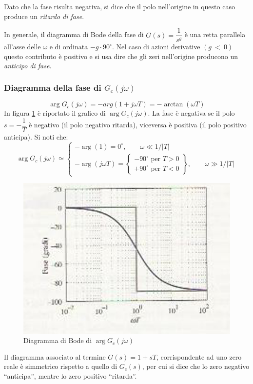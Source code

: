 \documentclass[a4paper]{report}
\begin{document}
Dato che la fase risulta negativa, si dice che il polo nell'origine in
questo caso produce un \emph{ritardo di fase}.

In generale, il diagramma di Bode della fase di $G(s) =
\dfrac{1}{s^g}$ \`e una retta parallela all'asse delle $\omega$ e di
ordinata $-g \cdot 90^{\circ}$. Nel caso di azioni derivative $(g~<~0)$
questo contributo \`e positivo e si usa dire che gli zeri nell'origine
producono un \emph{anticipo di fase}.

\subsubsection{Diagramma della fase di $G_c(j\omega)$}
\begin{displaymath}
  \arg G_c(j\omega)=-arg(1 + j\omega T)= -\arctan (\omega T)
\end{displaymath}
In figura \ref{fig:fasi3} \`e riportato il grafico di $\arg
G_c(j\omega)$. La fase \`e negativa se il polo $s= -\dfrac{1}{T}$ \`e
negativo (il polo negativo ritarda), viceversa \`e positiva (il polo
positivo anticipa). Si noti che:
\begin{displaymath}
  \arg G_c(j\omega) \simeq
  \left\{
  \begin{array}{l}
    -\arg(1)=0^{\circ},\qquad \omega \ll1/|T| \\
    -\arg(j\omega T) = \left\{\begin{array}{l}-90^{\circ} \textrm{ per } T>0 \\
    +90^{\circ} \textrm{ per }  T<0
    \end{array}\right\},\qquad \omega \gg1/|T|
  \end{array}\right.
\end{displaymath}
\begin{figure}[!hbp]
  \begin{center}
    \includegraphics[scale=0.5]{./figures/diagfas3.png}
    \caption{Diagramma di Bode di $\arg G_c(j\omega)$}
    \label{fig:fasi3}
  \end{center}
\end{figure} 
Il diagramma associato al termine $G(s)=1 + sT$, corrispondente ad uno
zero reale \`e simmetrico rispetto a quello di $G_c(s)$, per cui si
dice che lo zero negativo ``anticipa'', mentre lo zero positivo
``ritarda''.
\end{document}
